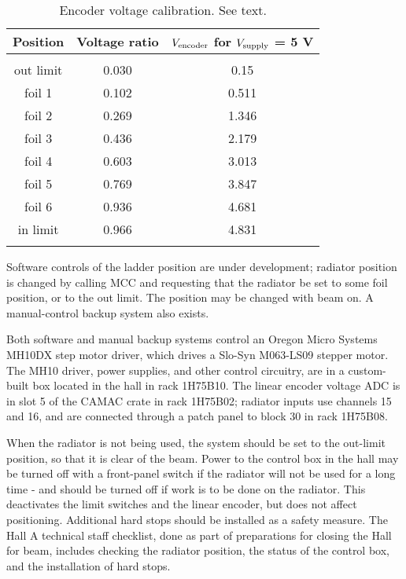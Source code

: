 {\begin{table}
\begin{center}
\caption[Bremsstrahlung Radiator: Encoder Calibration]{Encoder voltage 
calibration. See text.}
\begin{tabular}{ccc}
\hline
\hline
Position & Voltage ratio & $V_{\rm encoder}$ for $V_{\rm supply}$ = 5 V \\
\hline \\
out limit & 0.030 & 0.15 \\
 foil 1 & 0.102 & 0.511 \\
 foil 2 & 0.269 & 1.346 \\
 foil 3 & 0.436 & 2.179 \\
 foil 4 & 0.603 & 3.013 \\
 foil 5 & 0.769 & 3.847 \\
 foil 6 & 0.936 & 4.681 \\
 in limit & 0.966 & 4.831 \\
\hline \hline \\
\end{tabular}
\end{center}
\end{table}

Software controls of the ladder position are under development;
radiator position is changed by calling
MCC and requesting that the radiator be set to some foil position,
or to the out limit.
The position may be changed with beam on.
A manual-control backup system also exists.

Both software and manual backup systems
control an Oregon Micro Systems MH10DX step motor driver,
which drives a Slo-Syn M063-LS09 stepper motor.
The MH10 driver, power supplies, and other control circuitry, 
are in a custom-built box located in the hall in rack 1H75B10.
The linear encoder voltage ADC is in slot 5 of the CAMAC crate in 
rack 1H75B02; radiator inputs use channels 15 and 16, and
are connected through a patch panel to block 30 in rack 1H75B08.

When the radiator is not being used, the system should be set to the
out-limit position, so that it is clear of the beam.
Power to the control box in the hall may be turned off with a front-panel 
switch if the radiator will not be used for a long time - and should be 
turned off if work is to be done on the radiator.
This deactivates the limit switches and the linear encoder, 
but does not affect positioning.
Additional hard stops should be installed as a safety measure.
The Hall A technical staff checklist, done as part of preparations for
closing the Hall for beam, includes checking the radiator
position, the status of the control box, and the installation of hard stops.

}
